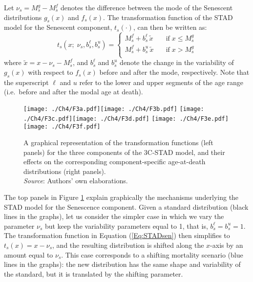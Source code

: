 \documentclass[Thesis]{subfiles}
\begin{document}
Let $\nu_{s} = M_{s}^{g} - M_{s}^{f}$ denotes the difference between the mode of the Senescent distributions $g_{s}(x)$ and $f_{s}(x)$. The transformation function of the STAD model for the Senescent component, $t_{s}(\cdot)$, can then be written as: 
%
\begin{equation}\label{Eq:STADsen}
t_{s}(x;\;\nu_{s},b_{s}^{\ell},b_{s}^{u}) = \left\{ \begin{array}{ll}
M_{s}^{f} + b_{s}^{\ell} \, \tilde{x} \quad & \mathrm{if} \; x \leq M_{s}^{g} \\
M_{s}^{f} + b_{s}^{u} \, \tilde{x} \quad & \mathrm{if} \; x >  M_{s}^{g} \\
\end{array}
\right.
\end{equation}
%
where $\tilde{x} = x - \nu_{s} - M_{s}^{f}$, and $b_{s}^{\ell}$ and $b_{s}^{u}$ denote the change in the variability of $g_{s}(x)$ with respect to $f_{s}(x)$ before and after the mode, respectively. Note that the superscript $\ell$ and $u$ refer to the lower and upper segments of the age range (i.e.~before and after the modal age at death). 

\begin{figure}[!ht]
	\begin{center}
		\texttt{[image: ./Ch4/F3a.pdf]}\texttt{[image: ./Ch4/F3b.pdf]}
		\texttt{[image: ./Ch4/F3c.pdf]}\texttt{[image: ./Ch4/F3d.pdf]}
		\texttt{[image: ./Ch4/F3e.pdf]}\texttt{[image: ./Ch4/F3f.pdf]}
		\caption{A graphical representation of the transformation functions (left panels) for the three components of the 3C-STAD model, and their effects on the corresponding component-specific age-at-death distributions (right panels).\\\footnotesize{\textit{Source}: Authors' own elaborations.} \label{Fig:STADexample}}
	\end{center}
\end{figure}

The top panels in Figure \ref{Fig:STADexample} explain graphically the mechanisms underlying the STAD model for the Senescence component. Given a standard distribution (black lines in the graphs), let us consider the simpler case in which we vary the parameter $\nu_{s}$ but keep the variability parameters equal to 1, that is, $b_{s}^{\ell} = b_{s}^{u} = 1$. The transformation function in Equation (\ref{Eq:STADsen}) then simplifies to $t_{s}(x) = x - \nu_{s}$, and the resulting distribution is shifted along the $x$-axis by an amount equal to $\nu_{s}$. This case corresponds to a shifting mortality scenario (blue lines in the graphs): the new distribution has the same shape and variability of the standard, but it is  translated by the shifting parameter.
\end{document}
